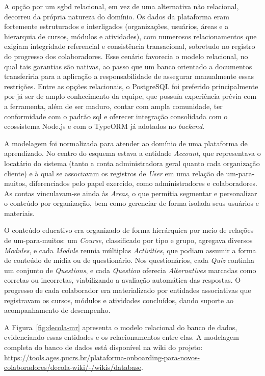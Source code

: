   A opção por um \ac{sgbd} relacional, em vez de uma alternativa não relacional, decorreu da própria natureza do domínio. Os dados da plataforma eram fortemente estruturados e interligados (organizações, usuários, áreas e a hierarquia de cursos, módulos e atividades), com numerosos relacionamentos que exigiam integridade referencial e consistência transacional, sobretudo no registro do progresso dos colaboradores. Esse cenário favorecia o modelo relacional, no qual tais garantias são nativas, ao passo que um banco orientado a documentos transferiria para a aplicação a responsabilidade de assegurar manualmente essas restrições. Entre as opções relacionais, o PostgreSQL foi preferido principalmente por já ser de amplo conhecimento da equipe, que possuía experiência prévia com a ferramenta, além de ser maduro, contar com ampla comunidade, ter conformidade com o padrão \ac{sql} e oferecer integração consolidada com o ecossistema Node.js e com o TypeORM já adotados no \textit{backend}.

  A modelagem foi normalizada para atender ao domínio de uma plataforma de aprendizado. No centro do esquema estava a entidade \textit{Account}, que representava o locatário do sistema (tanto a conta administradora geral quanto cada organização cliente) e à qual se associavam os registros de \textit{User} em uma relação de um-para-muitos, diferenciados pelo papel exercido, como administradores e colaboradores. As contas vinculavam-se ainda às \textit{Areas}, o que permitia segmentar e personalizar o conteúdo por organização, bem como gerenciar de forma isolada seus usuários e materiais.

  O conteúdo educativo era organizado de forma hierárquica por meio de relações de um-para-muitos: um \textit{Course}, classificado por tipo e grupo, agregava diversos \textit{Modules}, e cada \textit{Module} reunia múltiplas \textit{Activities}, que podiam assumir a forma de conteúdo de mídia ou de questionário. Nos questionários, cada \textit{Quiz} continha um conjunto de \textit{Questions}, e cada \textit{Question} oferecia \textit{Alternatives} marcadas como corretas ou incorretas, viabilizando a avaliação automática das respostas. O progresso de cada colaborador era materializado por entidades associativas que registravam os cursos, módulos e atividades concluídos, dando suporte ao acompanhamento de desempenho.

  A Figura~\ref{fig:decola-mr} apresenta o modelo relacional do banco de dados, evidenciando essas entidades e os relacionamentos entre elas. A modelagem completa do banco de dados está disponível na wiki do projeto: \url{https://tools.ages.pucrs.br/plataforma-onboarding-para-novos-colaboradores/decola-wiki/-/wikis/database}.


